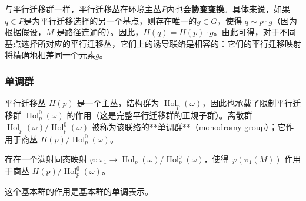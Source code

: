 与平行迁移群一样，平行迁移丛在环境主丛\(P\)内也会\textbf{协变变换}。具体来说，如果\(q \in P\)是为平行迁移选择的另一个基点，则存在唯一的\(g \in G\)，使得 \(q \sim p \cdot g\)（因为根据假设，\(M\) 是路径连通的）。因此，\(H(q) = H(p) \cdot g\)。由此可得，对于不同基点选择所对应的平行迁移丛，它们上的诱导联络是相容的：它们的平行迁移映射将精确地相差同一个元素\(g\)。
\subsubsection{单调群}  
平行迁移丛 \(H(p)\) 是一个主丛，结构群为 \(\operatorname{Hol}_p(\omega)\)，因此也承载了限制平行迁移群 \(\operatorname{Hol}_p^0(\omega)\) 的作用（这是完整平行迁移群的正规子群）。离散群 \(\operatorname{Hol}_p(\omega)/\operatorname{Hol}_p^0(\omega)\) 被称为该联络的**单调群**（monodromy group）；它作用于商丛 \(H(p)/\operatorname{Hol}_p^0(\omega)\)。  

存在一个满射同态映射 \(\varphi : \pi_1 \to \operatorname{Hol}_p(\omega)/\operatorname{Hol}_p^0(\omega)\)，使得 \(\varphi(\pi_1(M))\) 作用于商丛 \(H(p)/\operatorname{Hol}_p^0(\omega)\)。  

这个基本群的作用是基本群的单调表示。